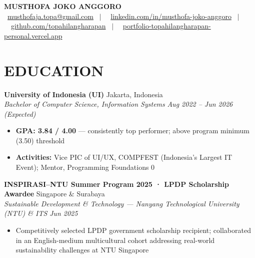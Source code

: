 \documentclass[10pt,a4paper]{article}
\newcommand{\contactline}[1]{\small #1}
\newcommand{\experienceheader}[4]{
    \textbf{#1} \hfill #2 \\
    \textit{#3} \hfill \textit{#4}
}
\begin{document}
\begin{center}
    {\LARGE \textbf{MUSTHOFA JOKO ANGGORO}} \\[2pt]
    \contactline{
        \faEnvelope\ \href{mailto:musthofaja.topa@gmail.com}{musthofaja.topa@gmail.com} \ $|$ \ 
        \faLinkedin\ \href{https://www.linkedin.com/in/musthofa-joko-anggoro/}{linkedin.com/in/musthofa-joko-anggoro} \ $|$ \
        \faGithub\ \href{https://github.com/topahilangharapan}{github.com/topahilangharapan} \ $|$ \
        \faGlobe\ \href{https://portfolio-topahilangharapan-personal.vercel.app/}{portfolio-topahilangharapan-personal.vercel.app}
    }
\end{center}

\vspace{-10pt}

\section*{EDUCATION}

\experienceheader{University of Indonesia (UI)}{Jakarta, Indonesia}{Bachelor of Computer Science, Information Systems}{Aug 2022 -- Jun 2026 (Expected)}
\begin{itemize}[leftmargin=*, itemsep=0pt, topsep=1pt]
    \item \textbf{GPA: 3.84 / 4.00} --- consistently top performer; above program minimum (3.50) threshold
    \item \textbf{Activities:} Vice PIC of UI/UX, COMPFEST (Indonesia's Largest IT Event); Mentor, Programming Foundations 0
\end{itemize}

\vspace{1pt}
\experienceheader{INSPIRASI--NTU Summer Program 2025 · \textbf{LPDP Scholarship Awardee}}{Singapore \& Surabaya}{Sustainable Development \& Technology --- Nanyang Technological University (NTU) \& ITS}{Jun 2025}
\begin{itemize}[leftmargin=*, itemsep=0pt, topsep=1pt]
    \item Competitively selected LPDP government scholarship recipient; collaborated in an English-medium multicultural cohort addressing real-world sustainability challenges at NTU Singapore
\end{itemize}
\end{document}
